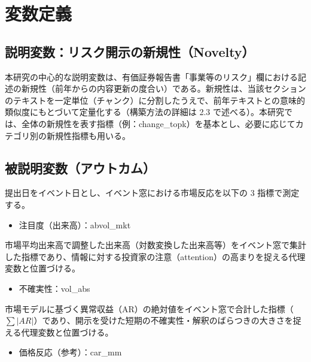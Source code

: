 \section{変数定義}

\subsection{説明変数：リスク開示の新規性（Novelty）}

本研究の中心的な説明変数は、有価証券報告書「事業等のリスク」欄における記述の新規性（前年からの内容更新の度合い）である。新規性は、当該セクションのテキストを一定単位（チャンク）に分割したうえで、前年テキストとの意味的類似度にもとづいて定量化する（構築方法の詳細は 2.3 で述べる）。本研究では、全体の新規性を表す指標（例：change\_topk）を基本とし、必要に応じてカテゴリ別の新規性指標も用いる。

\subsection{被説明変数（アウトカム）}

提出日をイベント日とし、イベント窓における市場反応を以下の 3 指標で測定する。

\begin{itemize}

  \item 注目度（出来高）：abvol\_mkt

\end{itemize}

市場平均出来高で調整した出来高（対数変換した出来高等）をイベント窓で集計した指標であり、情報に対する投資家の注意（attention）の高まりを捉える代理変数と位置づける。

\begin{itemize}

  \item 不確実性：vol\_abs

\end{itemize}

市場モデルに基づく異常収益（AR）の絶対値をイベント窓で合計した指標（\(\sum \lvert AR \rvert\)）であり、開示を受けた短期の不確実性・解釈のばらつきの大きさを捉える代理変数と位置づける。

\begin{itemize}

  \item 価格反応（参考）：car\_mm

\end{itemize}

